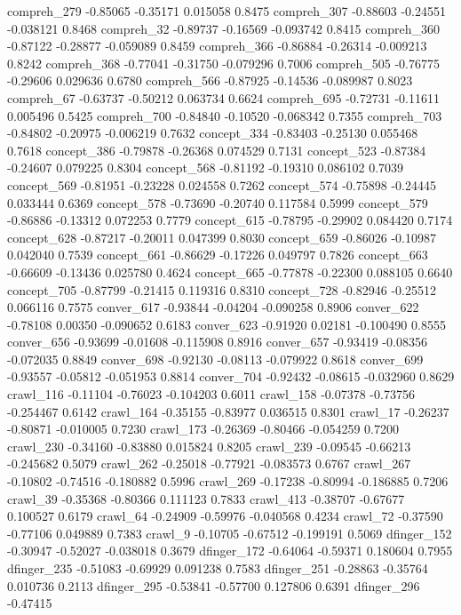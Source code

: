 \documentclass[10pt, letterpaper]{article}
\begin{document}
compreh\_279 -0.85065 -0.35171 0.015058 0.8475 compreh\_307 -0.88603
-0.24551 -0.038121 0.8468 compreh\_32 -0.89737 -0.16569 -0.093742 0.8415
compreh\_360 -0.87122 -0.28877 -0.059089 0.8459 compreh\_366 -0.86884
-0.26314 -0.009213 0.8242 compreh\_368 -0.77041 -0.31750 -0.079296
0.7006 compreh\_505 -0.76775 -0.29606 0.029636 0.6780 compreh\_566
-0.87925 -0.14536 -0.089987 0.8023 compreh\_67 -0.63737 -0.50212
0.063734 0.6624 compreh\_695 -0.72731 -0.11611 0.005496 0.5425
compreh\_700 -0.84840 -0.10520 -0.068342 0.7355 compreh\_703 -0.84802
-0.20975 -0.006219 0.7632 concept\_334 -0.83403 -0.25130 0.055468 0.7618
concept\_386 -0.79878 -0.26368 0.074529 0.7131 concept\_523 -0.87384
-0.24607 0.079225 0.8304 concept\_568 -0.81192 -0.19310 0.086102 0.7039
concept\_569 -0.81951 -0.23228 0.024558 0.7262 concept\_574 -0.75898
-0.24445 0.033444 0.6369 concept\_578 -0.73690 -0.20740 0.117584 0.5999
concept\_579 -0.86886 -0.13312 0.072253 0.7779 concept\_615 -0.78795
-0.29902 0.084420 0.7174 concept\_628 -0.87217 -0.20011 0.047399 0.8030
concept\_659 -0.86026 -0.10987 0.042040 0.7539 concept\_661 -0.86629
-0.17226 0.049797 0.7826 concept\_663 -0.66609 -0.13436 0.025780 0.4624
concept\_665 -0.77878 -0.22300 0.088105 0.6640 concept\_705 -0.87799
-0.21415 0.119316 0.8310 concept\_728 -0.82946 -0.25512 0.066116 0.7575
conver\_617 -0.93844 -0.04204 -0.090258 0.8906 conver\_622 -0.78108
0.00350 -0.090652 0.6183 conver\_623 -0.91920 0.02181 -0.100490 0.8555
conver\_656 -0.93699 -0.01608 -0.115908 0.8916 conver\_657 -0.93419
-0.08356 -0.072035 0.8849 conver\_698 -0.92130 -0.08113 -0.079922 0.8618
conver\_699 -0.93557 -0.05812 -0.051953 0.8814 conver\_704 -0.92432
-0.08615 -0.032960 0.8629 crawl\_116 -0.11104 -0.76023 -0.104203 0.6011
crawl\_158 -0.07378 -0.73756 -0.254467 0.6142 crawl\_164 -0.35155
-0.83977 0.036515 0.8301 crawl\_17 -0.26237 -0.80871 -0.010005 0.7230
crawl\_173 -0.26369 -0.80466 -0.054259 0.7200 crawl\_230 -0.34160
-0.83880 0.015824 0.8205 crawl\_239 -0.09545 -0.66213 -0.245682 0.5079
crawl\_262 -0.25018 -0.77921 -0.083573 0.6767 crawl\_267 -0.10802
-0.74516 -0.180882 0.5996 crawl\_269 -0.17238 -0.80994 -0.186885 0.7206
crawl\_39 -0.35368 -0.80366 0.111123 0.7833 crawl\_413 -0.38707 -0.67677
0.100527 0.6179 crawl\_64 -0.24909 -0.59976 -0.040568 0.4234 crawl\_72
-0.37590 -0.77106 0.049889 0.7383 crawl\_9 -0.10705 -0.67512 -0.199191
0.5069 dfinger\_152 -0.30947 -0.52027 -0.038018 0.3679 dfinger\_172
-0.64064 -0.59371 0.180604 0.7955 dfinger\_235 -0.51083 -0.69929
0.091238 0.7583 dfinger\_251 -0.28863 -0.35764 0.010736 0.2113
dfinger\_295 -0.53841 -0.57700 0.127806 0.6391 dfinger\_296 -0.47415
\end{document}
